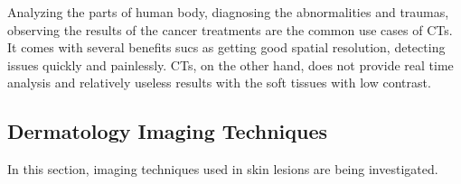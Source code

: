 \begin{itemize}
                    

                    Analyzing the parts of human body, diagnosing the abnormalities and traumas, observing the results of the cancer treatments are the common use cases of CTs.
                    It comes with several benefits sucs as getting good spatial resolution, detecting issues quickly and painlessly.
                    CTs, on the other hand, does not provide real time analysis and relatively useless results with the soft tissues with low contrast.

                

        \end{itemize}

    \subsection{Dermatology Imaging Techniques}

        In this section, imaging techniques used in skin lesions are being investigated.

